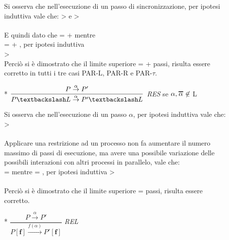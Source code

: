 \begin{itemize}
\begin{itemize}
			Si osserva che nell'esecuzione di un passo di sincronizzazione, per ipotesi induttiva vale che:  >  e  >  \\
			\\
			E quindi dato che  =  +  mentre\\  =  + , per ipotesi induttiva \\  > 
			\\
			
		Perciò si è dimostrato che il limite superiore   = +  passi, risulta essere corretto in tutti i tre casi PAR-L, PAR-R e PAR-$\tau$.
		\\
		\item[*]
			$\dfrac{P \overset{\alpha}\rightarrow P'}{P \textbackslash L \overset{\alpha}\rightarrow P' \textbackslash L}$ \textit{RES} se $\alpha, \Overline[1pt]{\alpha} \not\in$ L
			
			Si osserva che nell'esecuzione di un passo $\alpha$, per ipotesi induttiva vale che:  >   \\
			\\
			Applicare una restrizione ad un processo non fa aumentare il numero massimo di passi di esecuzione, ma avere una possibile variazione delle possibili interazioni con altri processi in parallelo, vale che:\\  =  mentre  = , per ipotesi induttiva  > \\
			\\
		Perciò si è dimostrato che il limite superiore  =  passi, risulta essere corretto.
		\\
			
		\item[*]
			$\dfrac{P \overset{\alpha}\rightarrow P'}{P \mathbf{[f]} \overset{f(\alpha)}\rightarrow P'\mathbf{[f]}}$ \textit{REL} 
			

\end{itemize}
\end{itemize}
